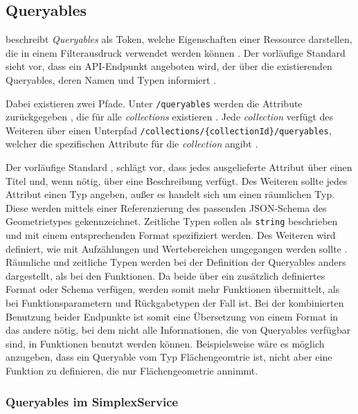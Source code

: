 \subsection{Queryables}
\label{sec:queryables}

 beschreibt \textit{Queryables} als Token, welche Eigenschaften einer Ressource darstellen, die in einem Filterausdruck verwendet werden können . Der vorläufige Standard sieht vor, dass ein \ac{API}-Endpunkt angeboten wird, der über die existierenden Queryables, deren Namen und Typen informiert .

Dabei existieren zwei Pfade. Unter \texttt{/queryables} werden die Attribute zurückgegeben , die für alle \textit{collections} existieren . Jede \textit{collection} verfügt des Weiteren über einen Unterpfad \texttt{/collections/\{collectionId\}/queryables}, welcher die spezifischen Attribute für die \textit{collection} angibt .

Der vorläufige Standard , schlägt vor, dass jedes ausgelieferte Attribut über einen Titel und, wenn nötig, über eine Beschreibung verfügt. Des Weiteren sollte jedes Attribut einen Typ angeben, außer es handelt sich um einen räumlichen Typ. Diese werden mittels einer Referenzierung des passenden \ac{JSON}-Schema des Geometrietypes gekennzeichnet. Zeitliche Typen sollen als \texttt{string} beschrieben und mit einem entsprechenden Format spezifiziert werden. Des Weiteren wird definiert, wie mit Aufzählungen und Wertebereichen umgegangen werden sollte . Räumliche und zeitliche Typen werden bei der Definition der Queryables anders dargestellt, als bei den Funktionen. Da beide über ein zusätzlich definiertes Format oder Schema verfügen, werden somit mehr Funktionen übermittelt, als bei Funktionsparametern und Rückgabetypen der Fall ist. Bei der kombinierten Benutzung beider Endpunkte ist somit eine Übersetzung von einem Format in das andere nötig, bei dem nicht alle Informationen, die von Queryables verfügbar sind, in Funktionen benutzt werden können. Beispielsweise wäre es möglich anzugeben, dass ein Queryable vom Typ Flächengeomtrie ist, nicht aber eine Funktion zu definieren, die nur Flächengeometrie annimmt.

\subsubsection{Queryables im SimplexService}

